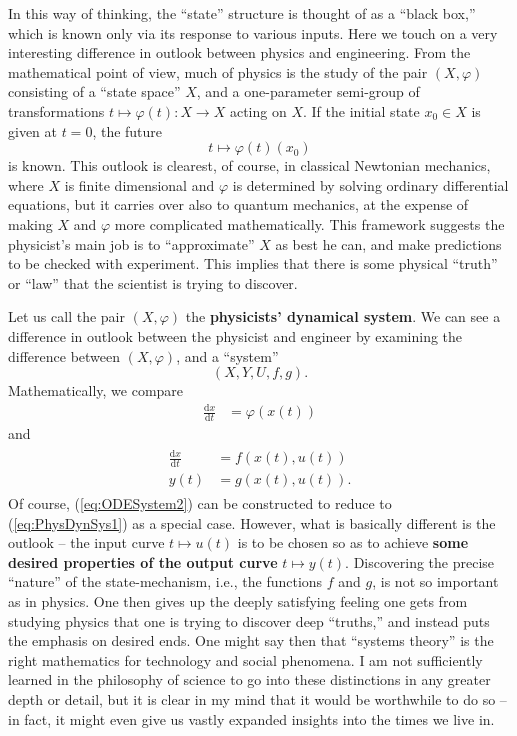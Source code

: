 \documentclass[12pt]{book}
\theoremstyle{plain}
\theoremstyle{definition}
\newcommand{\dd}[1]{\mathrm{d}#1}
\begin{document}
\begin{enumerate}
    In this way of thinking, the ``state'' structure is thought of as a ``black box,'' which is known only via its response to various inputs.
    Here we touch on a very interesting difference in outlook between physics and engineering.
    From the mathematical point of view, much of physics is the study of the pair $(X, \varphi)$ consisting of a ``state space'' $X$, and a one-parameter semi-group of transformations $t \mapsto \varphi(t): X \to X$ acting on $X$.
    If the initial state $x_0 \in X$ is given at $t = 0$, the future
    $$t \mapsto \varphi(t)(x_0)$$
    is known.
    This outlook is clearest, of course, in classical Newtonian mechanics, where $X$ is finite dimensional and $\varphi$ is determined by solving ordinary differential equations, but it carries over also to quantum mechanics, at the expense of making $X$ and $\varphi$ more complicated mathematically.
    This framework suggests the physicist's main job is to ``approximate'' $X$ as best he can, and make predictions to be checked with experiment.
    This implies that there is some physical ``truth'' or ``law'' that the scientist is trying to discover.
\end{enumerate}

Let us call the pair $(X, \varphi)$ the \textbf{physicists' dynamical system}.
We can see a difference in outlook between the physicist and engineer by examining the difference between $(X, \varphi)$, and a ``system''
$$(X, Y, U, f, g).$$
Mathematically, we compare
\begin{align} \label{eq:PhysDynSys1}
    \frac{\dd{x}}{\dd{t}} &= \varphi(x(t))
\end{align}
and
\begin{align}
\begin{split} \label{eq:ODESystem2}
    \frac{\dd{x}}{\dd{t}} &= f(x(t), u(t)) \\
    y(t) &= g(x(t), u(t)).
\end{split}
\end{align}
Of course, (\ref{eq:ODESystem2}) can be constructed to reduce to (\ref{eq:PhysDynSys1}) as a special case.
However, what is basically different is the outlook -- the input curve $t \mapsto u(t)$ is to be chosen so as to achieve \textbf{some desired properties of the output curve} $t \mapsto y(t)$.
Discovering the precise ``nature'' of the state-mechanism, i.e., the functions $f$ and $g$, is not so important as in physics.
One then gives up the deeply satisfying feeling one gets from studying physics that one is trying to discover deep ``truths,'' and instead puts the emphasis on desired ends.
One might say then that ``systems theory'' is the right mathematics for technology and social phenomena.
I am not sufficiently learned in the philosophy of science to go into these distinctions in any greater depth or detail, but it is clear in my mind that it would be worthwhile to do so -- in fact, it might even give us vastly expanded insights into the times we live in.
\end{document}
